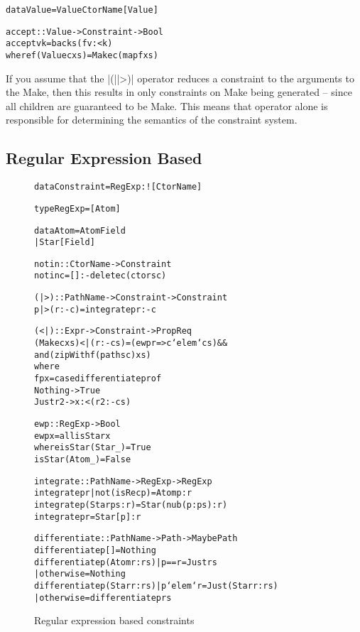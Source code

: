 \documentclass[preprint]{sigplanconf}
\newcommand{\C}[1]{\textsf{#1}}
\newenvironment{code}{\begin{alltt}\small}{\end{alltt}}
\begin{document}
\begin{code}
data Value = Value CtorName [Value]

accept :: Value -> Constraint -> Bool
accept v k = backs (f v :< k)
    where f (Value c xs) = Make c (map f xs)
\end{code}

If you assume that the |(||>)| operator reduces a constraint to the arguments to the \C{Make}, then this results in only constraints on \C{Make} being generated -- since all children are guaranteed to be \C{Make}. This means that operator alone is responsible for determining the semantics of the constraint system.

\subsection{Regular Expression Based}

\begin{figure}
\begin{code}
data Constraint = RegExp :! [CtorName]

type RegExp = [Atom]

data Atom  =  Atom  Field
           |  Star  [Field]

notin :: CtorName -> Constraint
notin c = [] :- delete c (ctors c)

(|>) :: PathName -> Constraint -> Constraint
p |> (r :- c) = integrate p r :- c

(<|) :: Expr -> Constraint -> Prop Req
(Make c xs) <| (r :- cs) = (ewp r => c `elem` cs) &&
    and (zipWith f (paths c) xs)
    where
    f p x = case  differentiate p r of
                  Nothing -> True
                  Just r2 -> x :< (r2 :- cs)

ewp :: RegExp -> Bool
ewp x = all isStar x
   where  isStar (Star  _) = True
          isStar (Atom  _) = False

integrate :: PathName -> RegExp -> RegExp
integrate p r | not (isRec p) = Atom p : r
integrate p (Star ps:r) = Star (nub (p:ps) : r)
integrate p r = Star [p] : r

differentiate :: PathName -> Path -> Maybe Path
differentiate p [] = Nothing
differentiate p (Atom  r:rs)  | p == r     = Just rs
                              | otherwise  = Nothing
differentiate p (Star  r:rs)  | p `elem` r  = Just (Star r:rs)
                              | otherwise   = differentiate p rs
\end{code}
\caption{Regular expression based constraints}
\label{fig:regexp}
\end{figure}
\end{document}
